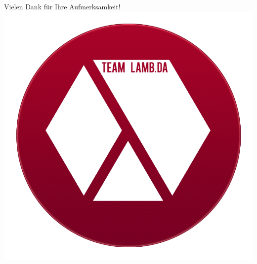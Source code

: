 \documentclass[18pt]{beamer}
\begin{document}
\begin{frame}
	\centering
	\huge Vielen Dank für Ihre Aufmerksamkeit!
	\includegraphics[scale=0.8]{team_lambda_lg.png}
\end{frame}
\end{document}
